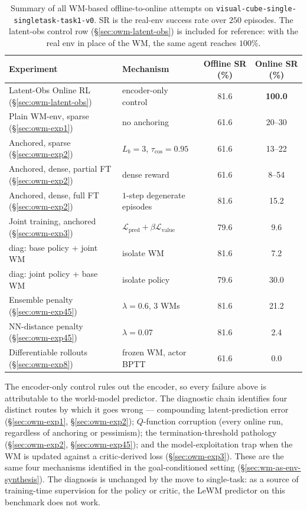 \begin{table}[h]
\centering
\caption{Summary of all WM-based offline-to-online attempts on
   \texttt{visual-cube-single-singletask-task1-v0}. SR is the real-env
   success rate over $250$ episodes. The latent-obs control row
   (§\ref{sec:owm-latent-obs}) is included for reference: with the real
   env in place of the WM, the same agent reaches $100\%$.}
\label{tab:owm-summary}
\begin{tabular}{l l c c}
\toprule
Experiment & Mechanism & Offline SR (\%) & Online SR (\%) \\
\midrule
Latent-Obs Online RL (§\ref{sec:owm-latent-obs}) & encoder-only control & 81.6 & \textbf{100.0} \\
\midrule
Plain WM-env, sparse (§\ref{sec:owm-exp1})       & no anchoring          & 61.6 & 20--30 \\
Anchored, sparse (§\ref{sec:owm-exp2})           & $L_b{=}3$, $\tau_{\cos}{=}0.95$ & 61.6 & 13--22 \\
Anchored, dense, partial FT (§\ref{sec:owm-exp2})& dense reward          & 61.6 & 8--54 \\
Anchored, dense, full FT (§\ref{sec:owm-exp2})   & $1$-step degenerate episodes & 81.6 & 15.2 \\
Joint training, anchored (§\ref{sec:owm-exp3})   & $\mathcal{L}_{\text{pred}}+\beta\mathcal{L}_{\text{value}}$ & 79.6 & 9.6 \\
\quad diag: base policy + joint WM               & isolate WM            & 81.6 & 7.2 \\
\quad diag: joint policy + base WM               & isolate policy        & 79.6 & 30.0 \\
Ensemble penalty (§\ref{sec:owm-exp45})          & $\lambda{=}0.6$, $3$ WMs & 81.6 & 21.2 \\
NN-distance penalty (§\ref{sec:owm-exp45})       & $\lambda{=}0.07$       & 81.6 & 2.4 \\
Differentiable rollouts (§\ref{sec:owm-exp8})    & frozen WM, actor BPTT  & 61.6 & 0.0 \\
\bottomrule
\end{tabular}
\end{table}

The encoder-only control rules out the encoder, so every failure above
is attributable to the world-model predictor. The diagnostic chain
identifies four distinct routes by which it goes wrong --- compounding
latent-prediction error (§\ref{sec:owm-exp1}, §\ref{sec:owm-exp2});
$Q$-function corruption (every online run, regardless of anchoring or
pessimism); the termination-threshold pathology
(§\ref{sec:owm-exp2}, §\ref{sec:owm-exp45}); and the
model-exploitation trap when the WM is updated against a
critic-derived loss (§\ref{sec:owm-exp3}). These are the same four
mechanisms identified in the goal-conditioned setting
(\S\ref{sec:wm-as-env-synthesis}). The diagnosis is unchanged by the
move to single-task: as a source of training-time supervision for the
policy or critic, the LeWM predictor on this benchmark does not work.

